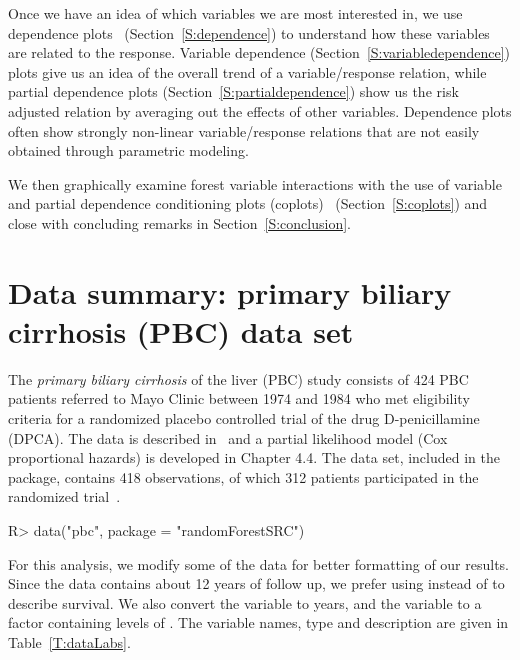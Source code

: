 \documentclass[nojss]{jss}
\begin{document}
Once we have an idea of which variables we are most interested in, we use dependence plots~\citep{Friedman:2000} (Section~\ref{S:dependence}) to understand how these variables are related to the response. Variable dependence (Section~\ref{S:variabledependence}) plots give us an idea of the overall trend of a variable/response relation, while partial dependence plots (Section~\ref{S:partialdependence}) show us the risk adjusted relation by averaging out the effects of other variables. Dependence plots often show strongly non-linear variable/response relations that are not easily obtained through parametric modeling.

We then graphically examine forest variable interactions with the use of variable and partial dependence conditioning plots (coplots)~\citep{chambers:1992,cleveland:1993} (Section~\ref{S:coplots}) and close with concluding remarks in Section~\ref{S:conclusion}.



\section{Data summary: primary biliary cirrhosis (PBC) data set}\label{S:data}

The \emph{primary biliary cirrhosis} of the  liver (PBC) study consists of 424 PBC patients referred to Mayo Clinic between 1974 and 1984 who met eligibility criteria for a randomized placebo controlled trial of the drug D-penicillamine (DPCA). The data is described in~\cite[Chapter 0.2]{fleming:1991} and a partial likelihood model (Cox proportional hazards) is developed in Chapter 4.4. The  data set, included in the  package, contains 418 observations, of which 312 patients participated in the randomized trial~\cite[Appendix D]{fleming:1991}.
\begin{Schunk}
\begin{Sinput}
R> data("pbc", package = "randomForestSRC")
\end{Sinput}
\end{Schunk}



For this analysis, we modify some of the data for better formatting of our results. Since the data contains about 12 years of follow up, we prefer using  instead of  to describe survival. We also convert the  variable to years, and the  variable to a factor containing levels of . The variable names, type and description are given in Table~\ref{T:dataLabs}.
\end{document}
